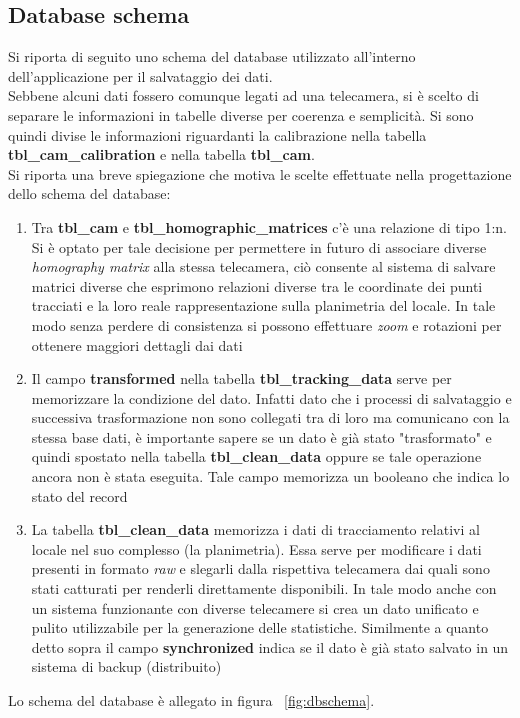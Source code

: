 \documentclass[a4paper,13pt,twoside]{article}
\begin{document}
\subsection{Database schema} \label{sec:dbschema}
Si riporta di seguito uno schema del database utilizzato all'interno dell'applicazione per il salvataggio dei dati. \\
Sebbene alcuni dati fossero comunque legati ad una telecamera, si è scelto di separare le informazioni in tabelle diverse per coerenza e semplicità. Si sono quindi divise le informazioni riguardanti la calibrazione nella tabella \textbf{tbl_cam_calibration} e nella tabella \textbf{tbl_cam}.\\
Si riporta una breve spiegazione che motiva le scelte effettuate nella progettazione dello schema del database:
\begin{enumerate}
	\item Tra \textbf{tbl_cam} e \textbf{tbl_homographic_matrices} c'è una relazione di tipo 1:n. Si è optato per tale decisione per permettere in futuro di associare diverse \textit{homography matrix} alla stessa telecamera, ciò consente al sistema di salvare matrici diverse che esprimono relazioni diverse tra le coordinate dei punti tracciati e la loro reale rappresentazione sulla planimetria del locale. In tale modo senza perdere di consistenza si possono effettuare \textit{zoom} e rotazioni per ottenere maggiori dettagli dai dati
	\item Il campo \textbf{transformed} nella tabella \textbf{tbl_tracking_data} serve per memorizzare la condizione del dato. Infatti dato che i processi di salvataggio e successiva trasformazione non sono collegati tra di loro ma comunicano con la stessa base dati, è importante sapere se un dato è già stato "trasformato" e quindi spostato nella tabella \textbf{tbl_clean_data} oppure se tale operazione ancora non è stata eseguita. Tale campo memorizza un booleano che indica lo stato del record
	\item La tabella \textbf{tbl_clean_data} memorizza i dati di tracciamento relativi al locale nel suo complesso (la planimetria). Essa serve per modificare i dati presenti in formato \textit{raw} e slegarli dalla rispettiva telecamera dai quali sono stati catturati per renderli direttamente disponibili. In tale modo anche con un sistema funzionante con diverse telecamere si crea un dato unificato e pulito utilizzabile per la generazione delle statistiche. Similmente a quanto detto sopra il campo \textbf{synchronized} indica se il dato è già stato salvato in un sistema di backup (distribuito)
\end{enumerate}
Lo schema del database è allegato in figura ~\ref{fig:dbschema}.
\end{document}
